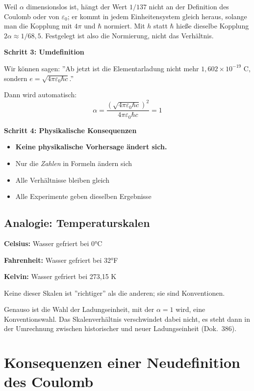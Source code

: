 	Weil $\alpha$ dimensionslos ist, hängt der Wert $1/137$ nicht an der Definition des Coulomb oder von $\varepsilon_0$; er kommt in jedem Einheitensystem gleich heraus, solange man die Kopplung mit $4\pi$ und $\hbar$ normiert. Mit $h$ statt $\hbar$ hieße dieselbe Kopplung $2\alpha \approx 1/68{,}5$. Festgelegt ist also die Normierung, nicht das Verhältnis.
	
	\textbf{Schritt 3: Umdefinition}
	
	Wir können sagen: ''Ab jetzt ist die Elementarladung nicht mehr $1{,}602 \times 10^{-19}$ C, sondern $e = \sqrt{4\pi\varepsilon_0\hbar c}$.''
	
	Dann wird automatisch:
	\begin{equation}
		\alpha = \frac{(\sqrt{4\pi\varepsilon_0\hbar c})^2}{4\pi\varepsilon_0\hbar c} = 1
	\end{equation}
	
	\textbf{Schritt 4: Physikalische Konsequenzen}
	
	\begin{itemize}
		\item \textbf{Keine physikalische Vorhersage ändert sich.}
		\item Nur die \textit{Zahlen} in Formeln ändern sich
		\item Alle Verhältnisse bleiben gleich
		\item Alle Experimente geben dieselben Ergebnisse
	\end{itemize}
	
	\subsection{Analogie: Temperaturskalen}
	
	\textbf{Celsius:} Wasser gefriert bei 0°C
	
	\textbf{Fahrenheit:} Wasser gefriert bei 32°F
	
	\textbf{Kelvin:} Wasser gefriert bei 273{,}15 K
	
	Keine dieser Skalen ist ''richtiger'' als die anderen; sie sind Konventionen.
	
	Genauso ist die Wahl der Ladungseinheit, mit der $\alpha = 1$ wird, eine Konventionswahl. Das Skalenverhältnis verschwindet dabei nicht, es steht dann in der Umrechnung zwischen historischer und neuer Ladungseinheit (Dok.~386).
	
	\section{Konsequenzen einer Neudefinition des Coulomb}
	
